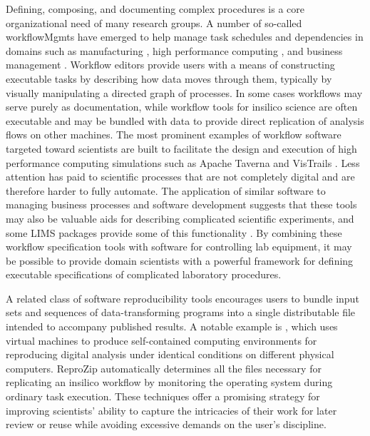 \documentclass[../thesis]{subfiles}
\begin{document}
Defining, composing, and documenting complex procedures is a core
organizational need of many research groups. A number of so-called
\glspl{workflowMgmt} have emerged to help manage task schedules and
dependencies in domains such as manufacturing
\cite{Allweyer:2010:BPM:1841147}, high performance computing
\cite{VisTrails}, and business management
\cite{cardoso2004workflow}. Workflow editors provide users with a
means of constructing executable tasks by describing how
data moves through them, typically by visually manipulating a directed
graph of processes. In some cases workflows may serve purely as
documentation, while workflow tools for \gls{insilico} science
are often executable and may be bundled with data to provide direct
replication of analysis flows on other machines. The most prominent
examples of workflow software
targeted toward scientists are built to facilitate the design and
execution of high performance computing simulations such as Apache
Taverna \cite{Taverna} and VisTrails \cite{VisTrails}. Less
attention has paid to scientific processes that are not completely digital
and are therefore harder to fully automate. The application
of similar software to managing business processes and software
development suggests that these tools may also be valuable aids for
describing complicated scientific experiments, and some \gls{LIMS} packages
provide some of this functionality \cite{CoreLIMS}. By combining these
workflow specification tools with software for controlling lab
equipment, it may be possible to provide domain scientists with a
powerful framework for defining executable specifications of
complicated laboratory procedures.

A related class of software reproducibility tools encourages users to
bundle input sets and sequences of data-transforming programs into a
single distributable file intended to accompany published results.
A notable example is \cite{ReproZip}, which uses virtual machines to
produce self-contained computing environments for reproducing digital
analysis under identical conditions on different physical
computers. ReproZip automatically determines all the files necessary
for replicating an \gls{insilico} workflow by monitoring the operating
system during ordinary task execution. These techniques offer a
promising strategy for improving scientists' ability to capture the
intricacies of their work for later review or reuse while avoiding
excessive demands on the user's discipline.
\end{document}
